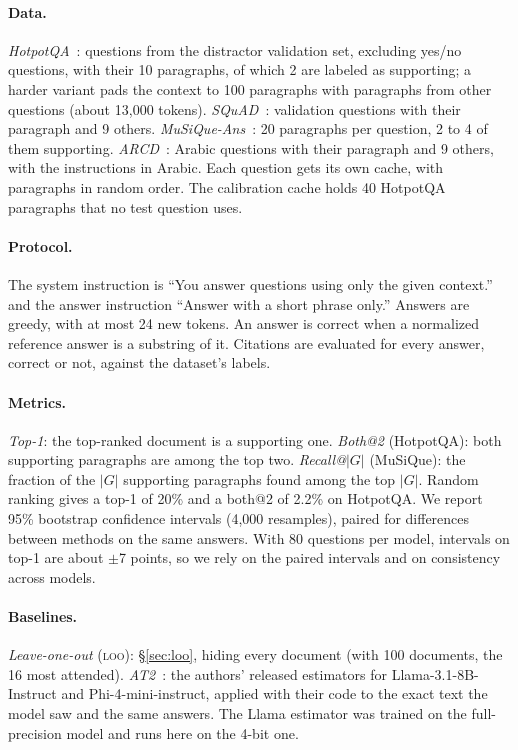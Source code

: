 \documentclass[11pt]{article}
\newcommand{\loo}{\textsc{loo}}
\begin{document}
\paragraph{Data.} \emph{HotpotQA}~\citep{yang2018hotpotqa}: questions from the distractor validation set, excluding yes/no questions, with their 10 paragraphs, of which 2 are labeled as supporting; a harder variant pads the context to 100 paragraphs with paragraphs from other questions (about 13{,}000 tokens). \emph{SQuAD}~\citep{rajpurkar2016squad}: validation questions with their paragraph and 9 others. \emph{MuSiQue-Ans}~\citep{trivedi2022musique}: 20 paragraphs per question, 2 to 4 of them supporting. \emph{ARCD}~\citep{mozannar2019arcd}: Arabic questions with their paragraph and 9 others, with the instructions in Arabic. Each question gets its own cache, with paragraphs in random order. The calibration cache holds 40 HotpotQA paragraphs that no test question uses.

\paragraph{Protocol.} The system instruction is ``You answer questions using only the given context.'' and the answer instruction ``Answer with a short phrase only.'' Answers are greedy, with at most 24 new tokens. An answer is correct when a normalized reference answer is a substring of it. Citations are evaluated for every answer, correct or not, against the dataset's labels.

\paragraph{Metrics.} \emph{Top-1}: the top-ranked document is a supporting one. \emph{Both@2} (HotpotQA): both supporting paragraphs are among the top two. \emph{Recall@$|G|$} (MuSiQue): the fraction of the $|G|$ supporting paragraphs found among the top $|G|$. Random ranking gives a top-1 of 20\% and a both@2 of 2.2\% on HotpotQA. We report 95\% bootstrap confidence intervals (4{,}000 resamples), paired for differences between methods on the same answers. With 80 questions per model, intervals on top-1 are about $\pm$7 points, so we rely on the paired intervals and on consistency across models.

\paragraph{Baselines.} \emph{Leave-one-out} (\loo): \S\ref{sec:loo}, hiding every document (with 100 documents, the 16 most attended). \emph{AT2}~\citep{cohenwang2025at2}: the authors' released estimators for Llama-3.1-8B-Instruct and Phi-4-mini-instruct, applied with their code to the exact text the model saw and the same answers. The Llama estimator was trained on the full-precision model and runs here on the 4-bit one.
\end{document}
